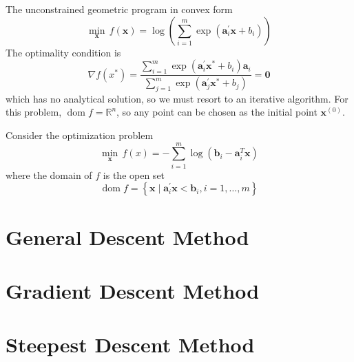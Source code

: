 \begin{example}
    The unconstrained geometric program in convex form
    \begin{equation*}
        \min_{\mathbf{x}}\,f(\mathbf{x})=\log \left(\sum_{i=1}^{m}\exp\left(\mathbf{a}_{i}^{\prime}\mathbf{x}+b_{i}\right)\right)
    \end{equation*}
    The optimality condition is
    \begin{equation*}
        \nabla f\left(x^{*}\right)=\frac{\sum_{i=1}^{m}\exp\left(\mathbf{a}_{i}^{\prime}\mathbf{x}^{*}+b_{i}\right)\mathbf{a}_{i}}{\sum_{j=1}^{m}\exp\left(\mathbf{a}_{j}^{\prime}\mathbf{x}^{*}+b_{j}\right)}=\mathbf{0}
    \end{equation*}
    which has no analytical solution, so we must resort to an iterative algorithm. For this problem, $\operatorname{dom} f=\mathbb{R}^{n}$, so any point can be chosen as the initial point $\mathbf{x}^{(0)}$.
\end{example}

\begin{example}
    Consider the optimization problem
    \begin{equation*}
        \min_{\mathbf{x}}\,f(x)=-\sum_{i=1}^{m}\log\left(\mathbf{b}_{i}-\mathbf{a}_{i}^{T}\mathbf{x}\right)
    \end{equation*}
    where the domain of $f$ is the open set
    \begin{equation*}
        \operatorname{dom}f=\left\{\mathbf{x}\mid\mathbf{a}_{i}^{\prime}\mathbf{x}<\mathbf{b}_{i},i=1,\ldots,m\right\}
    \end{equation*}
\end{example}

\begin{definition}

\end{definition}

\section{General Descent Method}

\section{Gradient Descent Method}

\section{Steepest Descent Method}

